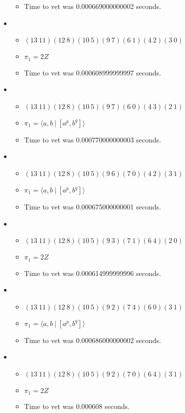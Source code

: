 \documentclass{article}
\begin{document}
\begin{itemize}
\begin{itemize}
      \item Time to vet was 0.000669000000002 seconds.
\end{itemize}
\item \begin{itemize}
      \item $(13\ 11)(12\ 8)(10\ 5)(9\ 7)(6\ 1)(4\ 2)(3\ 0)$
      \item $\pi_1 =2 Z$
      \item Time to vet was 0.000608999999997 seconds.
\end{itemize}
\item \begin{itemize}
      \item $(13\ 11)(12\ 8)(10\ 5)(9\ 7)(6\ 0)(4\ 3)(2\ 1)$
      \item $\pi_1 = \langle a,b\ |\ [a^p,b^q]\rangle$
      \item Time to vet was 0.000770000000003 seconds.
\end{itemize}
\item \begin{itemize}
      \item $(13\ 11)(12\ 8)(10\ 5)(9\ 6)(7\ 0)(4\ 2)(3\ 1)$
      \item $\pi_1 = \langle a,b\ |\ [a^p,b^q]\rangle$
      \item Time to vet was 0.000675000000001 seconds.
\end{itemize}
\item \begin{itemize}
      \item $(13\ 11)(12\ 8)(10\ 5)(9\ 3)(7\ 1)(6\ 4)(2\ 0)$
      \item $\pi_1 =2 Z$
      \item Time to vet was 0.000614999999996 seconds.
\end{itemize}
\item \begin{itemize}
      \item $(13\ 11)(12\ 8)(10\ 5)(9\ 2)(7\ 4)(6\ 0)(3\ 1)$
      \item $\pi_1 = \langle a,b\ |\ [a^p,b^q]\rangle$
      \item Time to vet was 0.000686000000002 seconds.
\end{itemize}
\item \begin{itemize}
      \item $(13\ 11)(12\ 8)(10\ 5)(9\ 2)(7\ 0)(6\ 4)(3\ 1)$
      \item $\pi_1 =2 Z$
      \item Time to vet was 0.000608 seconds.

\end{itemize}
\end{itemize}
\end{document}

